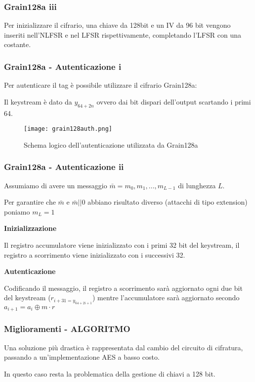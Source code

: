 \begin{frame}
    \frametitle{Grain128a iii}

    Per inizializzare il cifrario, una chiave da 128bit e un IV da 96 bit vengono inseriti nell'NLFSR e nel LFSR rispettivamente, completando l'LFSR con una costante.
\end{frame}

\begin{frame}
    \frametitle{Grain128a - Autenticazione i}

    Per autenticare il tag è possibile utilizzare il cifrario Grain128a:

    Il keystream è dato da $y_{64+2n}$ ovvero dai bit dispari dell'output scartando i primi 64.

    \begin{figure}
        \centering
        \texttt{[image: grain128auth.png]}
        \caption{Schema logico dell'autenticazione utilizzata da Grain128a}
    \end{figure}
\end{frame}

\begin{frame}
    \frametitle{Grain128a - Autenticazione ii}

    Assumiamo di avere un messaggio $\bar{m} = m_0,m_1,...,m_{L-1}$ di lunghezza $L$.

    Per garantire che $\bar{m}$ e $\bar{m}||0$ abbiano risultato diverso (attacchi di tipo extension) poniamo $m_L = 1$\pause

    \textbf{Inizializzazione}

    Il registro accumulatore viene inizializzato con i primi 32 bit del keystream, il registro a scorrimento viene inizializzato con i successivi 32.\pause

    \textbf{Autenticazione}

    Codificando il messaggio, il registro a scorrimento sarà aggiornato ogni due bit del keystream ($r_{i+31 = y_{64+2i+1}}$) mentre l'accumulatore sarà aggiornato secondo $a_{i+1} = a_i \oplus m \cdot r$
\end{frame}

\begin{frame}
    \frametitle{Miglioramenti - ALGORITMO}
    Una soluzione più drastica è rappresentata dal cambio del circuito di cifratura, passando a un'implementazione AES a basso costo.\cite{feldhofer2005aes}

    In questo caso resta la problematica della gestione di chiavi a 128 bit.
\end{frame}

